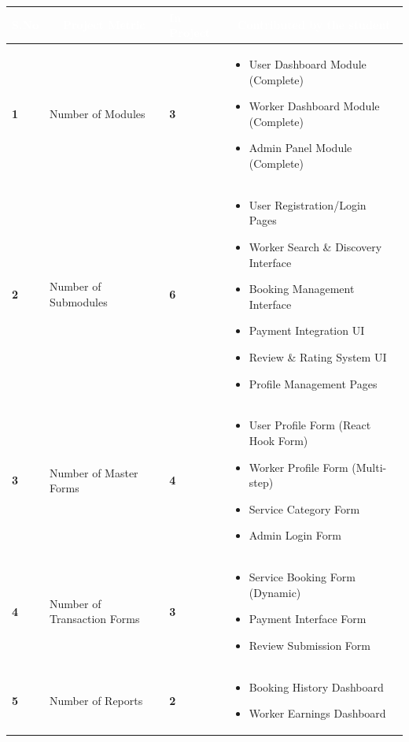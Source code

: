 \documentclass[12pt,a4paper]{article}
\begin{document}
\begin{table}[h!]
\centering
\renewcommand{\arraystretch}{1.3}
\begin{tabular}{|>{\centering\arraybackslash}p{1cm}|p{4.5cm}|>{\centering\arraybackslash}p{1.5cm}|p{7.5cm}|}
\hline
\rowcolor{headerblue}
\textcolor{white}{\textbf{S.No}} & 
\multicolumn{1}{c|}{\textcolor{white}{\textbf{Project Metric}}} & 
\textcolor{white}{\textbf{In Project}} & 
\multicolumn{1}{c|}{\textcolor{white}{\textbf{Contributed by the student}}} \\
\hline
\rowcolor{lightgray}
\textbf{1} & Number of Modules & \textbf{3} & 
\begin{itemize}[nosep, leftmargin=*, topsep=0pt]
    \item User Dashboard Module (Complete)
    \item Worker Dashboard Module (Complete)
    \item Admin Panel Module (Complete)
\end{itemize} \\
\hline

\textbf{2} & Number of Submodules & \textbf{6} & 
\begin{itemize}[nosep, leftmargin=*, topsep=0pt]
    \item User Registration/Login Pages
    \item Worker Search \& Discovery Interface
    \item Booking Management Interface
    \item Payment Integration UI
    \item Review \& Rating System UI
    \item Profile Management Pages
\end{itemize} \\
\hline
\rowcolor{lightgray}
\textbf{3} & Number of Master Forms & \textbf{4} & 
\begin{itemize}[nosep, leftmargin=*, topsep=0pt]
    \item User Profile Form (React Hook Form)
    \item Worker Profile Form (Multi-step)
    \item Service Category Form
    \item Admin Login Form
\end{itemize} \\
\hline

\textbf{4} & Number of Transaction Forms & \textbf{3} & 
\begin{itemize}[nosep, leftmargin=*, topsep=0pt]
    \item Service Booking Form (Dynamic)
    \item Payment Interface Form
    \item Review Submission Form
\end{itemize} \\
\hline
\rowcolor{lightgray}
\textbf{5} & Number of Reports & \textbf{2} & 
\begin{itemize}[nosep, leftmargin=*, topsep=0pt]
    \item Booking History Dashboard
    \item Worker Earnings Dashboard
\end{itemize} \\
\hline


\end{tabular}
\end{table}
\end{document}
